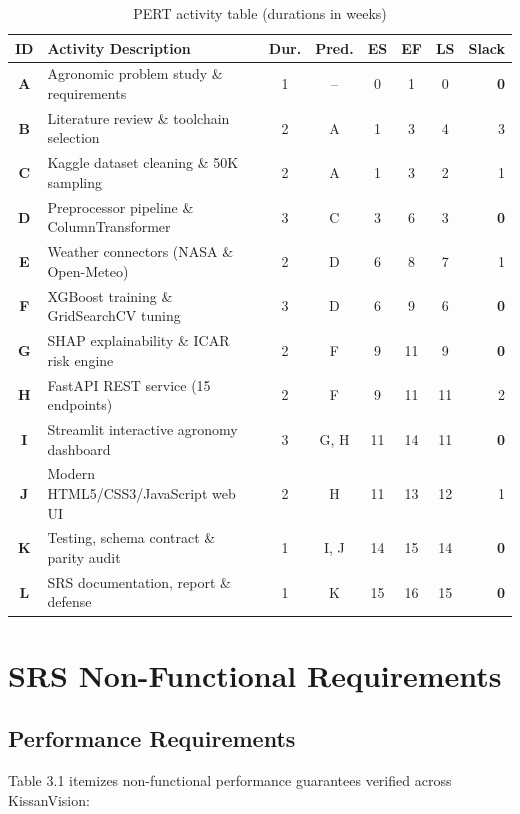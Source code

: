 \documentclass[11pt,a4paper]{report}
\begin{document}
\begin{table}[htbp]
\centering
\small
\caption{PERT activity table (durations in weeks)}
\begin{tabularx}{\textwidth}{cXcccccr}
\toprule
\textbf{ID} & \textbf{Activity Description} & \textbf{Dur.} & \textbf{Pred.} & \textbf{ES} & \textbf{EF} & \textbf{LS} & \textbf{Slack} \\
\midrule
\textbf{A} & Agronomic problem study \& requirements & 1 & -- & 0 & 1 & 0 & \textbf{0} \\
\textbf{B} & Literature review \& toolchain selection & 2 & A & 1 & 3 & 4 & 3 \\
\textbf{C} & Kaggle dataset cleaning \& 50K sampling & 2 & A & 1 & 3 & 2 & 1 \\
\textbf{D} & Preprocessor pipeline \& ColumnTransformer & 3 & C & 3 & 6 & 3 & \textbf{0} \\
\textbf{E} & Weather connectors (NASA \& Open-Meteo) & 2 & D & 6 & 8 & 7 & 1 \\
\textbf{F} & XGBoost training \& GridSearchCV tuning & 3 & D & 6 & 9 & 6 & \textbf{0} \\
\textbf{G} & SHAP explainability \& ICAR risk engine & 2 & F & 9 & 11 & 9 & \textbf{0} \\
\textbf{H} & FastAPI REST service (15 endpoints) & 2 & F & 9 & 11 & 11 & 2 \\
\textbf{I} & Streamlit interactive agronomy dashboard & 3 & G, H & 11 & 14 & 11 & \textbf{0} \\
\textbf{J} & Modern HTML5/CSS3/JavaScript web UI & 2 & H & 11 & 13 & 12 & 1 \\
\textbf{K} & Testing, schema contract \& parity audit & 1 & I, J & 14 & 15 & 14 & \textbf{0} \\
\textbf{L} & SRS documentation, report \& defense & 1 & K & 15 & 16 & 15 & \textbf{0} \\
\bottomrule
\end{tabularx}
\end{table}

\chapter{SRS Non-Functional Requirements}

\section{Performance Requirements}
Table 3.1 itemizes non-functional performance guarantees verified across KissanVision:
\end{document}
